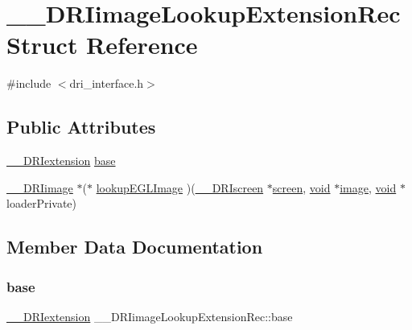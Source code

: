 \hypertarget{struct_____d_r_iimage_lookup_extension_rec}{}\section{\+\_\+\+\_\+\+D\+R\+Iimage\+Lookup\+Extension\+Rec Struct Reference}
\label{struct_____d_r_iimage_lookup_extension_rec}


{\ttfamily \#include $<$dri\+\_\+interface.\+h$>$}

\subsection*{Public Attributes}
\begin{DoxyCompactItemize}
\item 
\hyperlink{dri__interface_8h_a4e0a61c8ece00d2b2c6792a9a1b55385}{\+\_\+\+\_\+\+D\+R\+Iextension} \hyperlink{struct_____d_r_iimage_lookup_extension_rec_a5e2d2e1c2d65d01580035430431847a7}{base}
\item 
\hyperlink{dri__interface_8h_a37e0407153595dc88fe5d25127645cf1}{\+\_\+\+\_\+\+D\+R\+Iimage} $\ast$($\ast$ \hyperlink{struct_____d_r_iimage_lookup_extension_rec_a030f03ac2d3f52e13dc1ff3ecba753cf}{lookup\+E\+G\+L\+Image} )(\hyperlink{dri__interface_8h_a9961b01d421ee1fd6ed3c05acc9ca561}{\+\_\+\+\_\+\+D\+R\+Iscreen} $\ast$\hyperlink{cad_8h_ae04e09e4e3831bfc1632c509ae37dcec}{screen}, \hyperlink{_s_d_l__opengles2__gl2ext_8h_ae5d8fa23ad07c48bb609509eae494c95}{void} $\ast$\hyperlink{gl_8h_a0a221b005894579fea3b9eb7bfc2ee71}{image}, \hyperlink{_s_d_l__opengles2__gl2ext_8h_ae5d8fa23ad07c48bb609509eae494c95}{void} $\ast$loader\+Private)
\end{DoxyCompactItemize}


\subsection{Member Data Documentation}
\mbox{\label{struct_____d_r_iimage_lookup_extension_rec_a5e2d2e1c2d65d01580035430431847a7}} 
\subsubsection{\texorpdfstring{base}{base}}
{\footnotesize\ttfamily \hyperlink{dri__interface_8h_a4e0a61c8ece00d2b2c6792a9a1b55385}{\+\_\+\+\_\+\+D\+R\+Iextension} \+\_\+\+\_\+\+D\+R\+Iimage\+Lookup\+Extension\+Rec\+::base}

